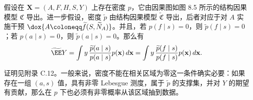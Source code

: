 

\begin{proposition}[加权改进]
假设在 $\mathbf X=(A,F,H,S,Y)$ 上存在密度 $p$，它由因果图如图 8.5 所示的结构因果模型 $\mathfrak C$ 导出。进一步假设，密度 $\widetilde p$ 由结构因果模型 $\widetilde{\mathfrak C}$ 导出，后者对应于对 $A$ 实施干预 $\dox{A\coloneqq\widetilde f(S,\widetilde N_A)}$。并且，若 $p(f\mid s)=0$，则 $\widetilde p(f\mid s)=0$；若 $p(a\mid s)=0$，则 $\widetilde p(a\mid s)=0$。那么有
\[
 \widetilde{\EE}Y
 =\int y\,\frac{\widetilde p(a\mid s)}{p(a\mid s)}p(\mathbf x)\,d\mathbf x
 =\int y\,\frac{\widetilde p(f\mid s)}{p(f\mid s)}p(\mathbf x)\,d\mathbf x.
\]
\end{proposition}

证明见附录 C.12。一般来说，密度不能在相关区域为零这一条件确实必要：如果存在一组 $(a,s)$ 值，具有非零 Lebesgue 测度，属于 $\widetilde p$ 的支撑集，并对 $Y$ 的期望有贡献，那么在 $p$ 下也必须有非零概率从该区域抽到数据。
\FloatBarrier
